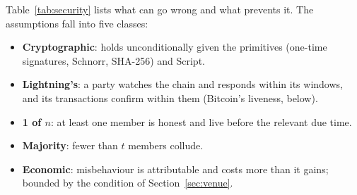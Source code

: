 \documentclass[11pt]{article}
\begin{document}
Table~\ref{tab:security} lists what can go wrong and what prevents it.
The assumptions fall into five classes:
\begin{itemize}
\item \textbf{Cryptographic}: holds unconditionally given the primitives
  (one-time signatures, Schnorr, SHA-256) and Script.
\item \textbf{Lightning's}: a party watches the chain and responds within
  its windows, and its transactions confirm within them (Bitcoin's
  liveness, below).
\item \textbf{1 of $n$}: at least one member is honest and live before
  the relevant due time.
\item \textbf{Majority}: fewer than $t$ members collude.
\item \textbf{Economic}: misbehaviour is attributable and costs more than
  it gains; bounded by the condition of Section~\ref{sec:venue}.
\end{itemize}
\end{document}
